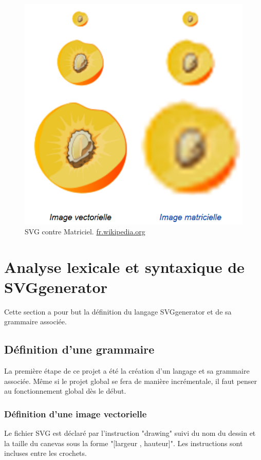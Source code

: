 \documentclass[11pt]{report} %
\begin{document}
\begin{figure}[h]
    \centering
    \includegraphics[scale=0.7]{img/SVG_vs_BMP.png}
    \caption{\label{CG} SVG contre Matriciel. \href{http://fr.wikipedia.org}{fr.wikipedia.org}}
\end{figure}

\chapter{Analyse lexicale et syntaxique de SVGgenerator}

Cette section a pour but la définition du langage SVGgenerator et de sa grammaire associée. 
\section{Définition d'une grammaire}
La première étape de ce projet a été la création d'un langage et sa grammaire associée. Même si le projet global se fera de manière incrémentale, il faut penser au fonctionnement global dès le début. 

\subsection{Définition d'une image vectorielle}

Le fichier SVG est déclaré par l'instruction "drawing" suivi du nom du dessin et la taille du canevas sous la forme "[largeur , hauteur]". Les instructions sont incluses entre les crochets.
\end{document}
